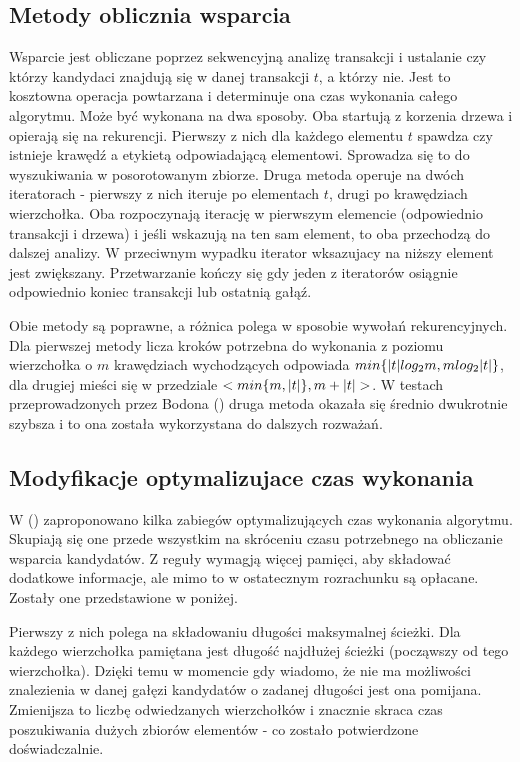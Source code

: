 \subsection*{Metody oblicznia wsparcia}
Wsparcie jest obliczane poprzez sekwencyjną analizę transakcji i ustalanie czy którzy kandydaci znajdują się w danej transakcji \(t\), a którzy nie. Jest to kosztowna operacja powtarzana i determinuje ona czas wykonania całego algorytmu. Może być wykonana na dwa sposoby. Oba startują z korzenia drzewa i opierają się na rekurencji. Pierwszy z nich dla każdego elementu \(t\) spawdza czy istnieje krawędź a etykietą odpowiadającą elementowi. Sprowadza się to do wyszukiwania w posorotowanym zbiorze. Druga metoda operuje na dwóch iteratorach - pierwszy z nich iteruje po elementach \(t\), drugi po krawędziach wierzchołka. Oba rozpoczynają iterację w pierwszym elemencie (odpowiednio transakcji i drzewa) i jeśli wskazują na ten sam element, to oba przechodzą do dalszej analizy. W przeciwnym wypadku iterator wksazujacy na niższy element jest zwiększany. Przetwarzanie kończy się gdy jeden z iteratorów osiągnie odpowiednio koniec transakcji lub ostatnią gałąź.

Obie metody są poprawne, a różnica polega w sposobie wywołań rekurencyjnych. Dla pierwszej metody licza kroków potrzebna do wykonania z poziomu wierzchołka o \(m\) krawędziach wychodzących odpowiada \(min\{|t| log_2{m},\nolinebreak m\nolinebreak log_2{|t|}\}\), dla drugiej mieści się w przedziale \(<min\{m,\nolinebreak|t|\},\nolinebreak m\nolinebreak+\nolinebreak|t|>\). W testach przeprowadzonych przez Bodona (\cite{Bodon}) druga metoda okazała się średnio dwukrotnie szybsza i to ona została wykorzystana do dalszych rozważań.

\subsection*{Modyfikacje optymalizujace czas wykonania}
W (\cite{Bodon}) zaproponowano kilka zabiegów optymalizujących czas wykonania algorytmu. Skupiają się one przede wszystkim na skróceniu czasu potrzebnego na obliczanie wsparcia kandydatów. Z reguły wymagją więcej pamięci, aby składować dodatkowe informacje, ale mimo to w ostatecznym rozrachunku są opłacane. Zostały one przedstawione w poniżej.

Pierwszy z nich polega na składowaniu długości maksymalnej ścieżki. Dla każdego wierzchołka pamiętana jest długość najdłużej ścieżki (począwszy od tego wierzchołka). Dzięki temu w momencie gdy wiadomo, że nie ma możliwości znalezienia w danej gałęzi kandydatów o zadanej długości jest ona pomijana. Zmienijsza to liczbę odwiedzanych wierzchołków i znacznie skraca czas poszukiwania dużych zbiorów elementów - co zostało potwierdzone doświadczalnie.

